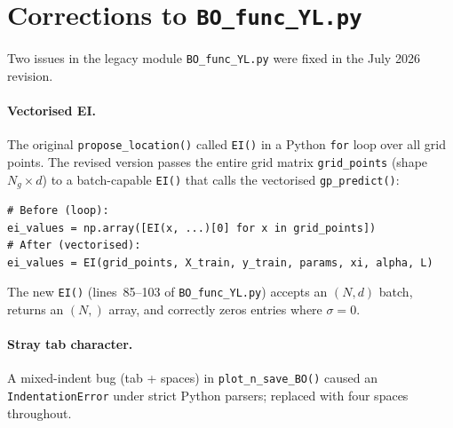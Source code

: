 \documentclass[11pt,a4paper]{article}
\theoremstyle{remark}
\newcommand{\codefile}[1]{\texttt{#1}}
\newcommand{\coderange}[2]{lines~#1--#2}
\newcommand{\codefn}[1]{\texttt{#1()}}
\begin{document}
\section{Corrections to \texttt{BO\_func\_YL.py}}
\label{sec:funcyl}

Two issues in the legacy module \codefile{BO\_func\_YL.py} were fixed in the
July 2026 revision.

\paragraph{Vectorised EI.}
The original \codefn{propose\_location} called \codefn{EI} in a Python
\texttt{for} loop over all grid points.  The revised version passes the entire
grid matrix \texttt{grid\_points} (shape $N_g \times d$) to a batch-capable
\codefn{EI} that calls the vectorised \codefn{gp\_predict}:
\begin{lstlisting}[numbers=none]
# Before (loop):
ei_values = np.array([EI(x, ...)[0] for x in grid_points])
# After (vectorised):
ei_values = EI(grid_points, X_train, y_train, params, xi, alpha, L)
\end{lstlisting}
The new \codefn{EI} (\coderange{85}{103} of \codefile{BO\_func\_YL.py})
accepts an $(N,d)$ batch, returns an $(N,)$ array, and correctly zeros
entries where $\sigma = 0$.

\paragraph{Stray tab character.}
A mixed-indent bug (tab + spaces) in \codefn{plot\_n\_save\_BO} caused an
\texttt{IndentationError} under strict Python parsers; replaced with four
spaces throughout.
\end{document}

